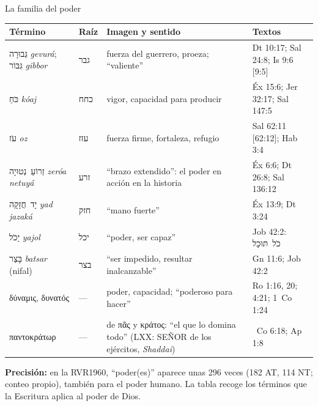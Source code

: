 \documentclass[hyperref={bookmarks=false},aspectratio=169]{beamer}
\newcommand{\heb}[1]{\mbox{\foreignlanguage{hebrew}{#1}}}
\newcommand{\grc}[1]{\foreignlanguage{ancientgreek}{#1}}
\newcommand{\SENOR}{S{\fontsize{0.78em}{1em}\selectfont EÑOR}}
\newcommand{\precision}[1]{{\footnotesize\color{gris}\textbf{Precisión:} #1}}
\begin{document}
\begin{frame}{La familia del poder}
\scriptsize\renewcommand{\arraystretch}{1.14}
\begin{tabular}{@{}>{\RaggedRight\arraybackslash}p{2.4cm}>{\RaggedRight\arraybackslash}p{0.9cm}>{\RaggedRight\arraybackslash}p{5.2cm}>{\RaggedRight\arraybackslash}p{3.4cm}@{}}
\toprule
\textbf{Término} & \textbf{Raíz} & \textbf{Imagen y sentido} & \textbf{Textos} \\ \midrule
\heb{גְּבוּרָה} \emph{gevurá}; \heb{גִּבּוֹר} \emph{gibbor} & \heb{גבר} & fuerza del guerrero, proeza; ``valiente'' & Dt 10:17; Sal 24:8; Is 9:6 [9:5] \\
\heb{כֹּחַ} \emph{kóaj} & \heb{כחח} & vigor, capacidad para producir & Éx 15:6; Jer 32:17; Sal 147:5 \\
\heb{עֹז} \emph{oz} & \heb{עזז} & fuerza firme, fortaleza, refugio & Sal 62:11 [62:12]; Hab 3:4 \\
\heb{זְרוֹעַ נְטוּיָה} \emph{zeróa netuyá} & \heb{זרע} & ``brazo extendido'': el poder en acción en la historia & Éx 6:6; Dt 26:8; Sal 136:12 \\
\heb{יָד חֲזָקָה} \emph{yad jazaká} & \heb{חזק} & ``mano fuerte'' & Éx 13:9; Dt 3:24 \\
\heb{יָכֹל} \emph{yajol} & \heb{יכל} & ``poder, ser capaz'' & Job 42:2: \heb{כֹל תּוּכָל} \\
\heb{בָּצַר} \emph{batsar} (nifal) & \heb{בצר} & ``ser impedido, resultar inalcanzable'' & Gn 11:6; Job 42:2 \\
\grc{δύναμις}, \grc{δυνατός} & --- & poder, capacidad; ``poderoso para hacer'' & Ro 1:16, 20; 4:21; 1~Co 1:24 \\
\grc{παντοκράτωρ} & --- & de \grc{πᾶς} y \grc{κράτος}: ``el que lo domina todo'' (LXX: \SENOR{} de los ejércitos, \emph{Shaddai}) & 2~Co 6:18; Ap 1:8 \\
\bottomrule
\end{tabular}\par\smallskip
\precision{en la RVR1960, ``poder(es)'' aparece unas 296 veces (182 AT, 114 NT; conteo propio), también para el poder humano. La tabla recoge los términos que la Escritura aplica al poder de Dios.}
\end{frame}
\end{document}
